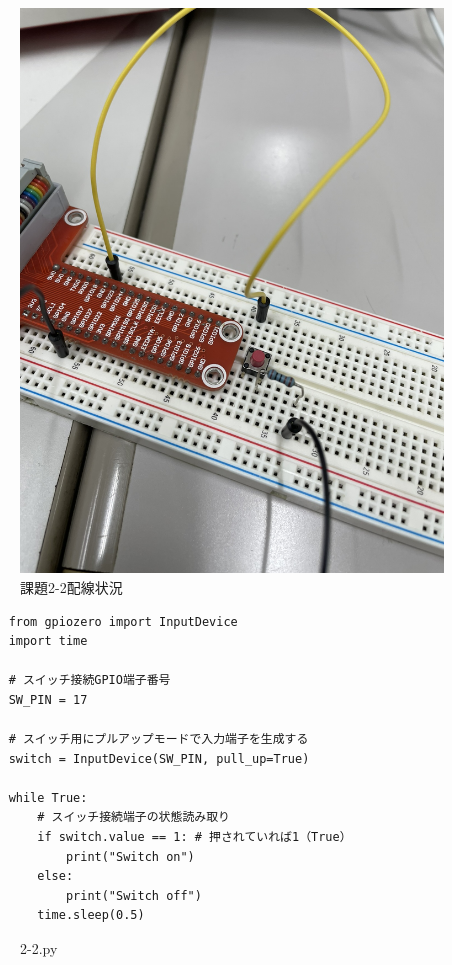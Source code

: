\documentclass{ltjsarticle} %
\begin{document}
\begin{figure}[H]
\begin{minipage}{0.45\textwidth}
    \includegraphics[width=\textwidth]{raspi2-2.JPEG} %
    \caption{課題2-2配線状況} %
    \label{fig:raspi2-2} %
  \end{minipage}
\end{figure}

\begin{mdframed}
  \begin{verbatim}
    from gpiozero import InputDevice
    import time

    # スイッチ接続GPIO端⼦番号
    SW_PIN = 17

    # スイッチ⽤にプルアップモードで⼊⼒端⼦を⽣成する
    switch = InputDevice(SW_PIN, pull_up=True)

    while True:
        # スイッチ接続端⼦の状態読み取り
        if switch.value == 1: # 押されていれば1（True）
            print("Switch on")
        else:
            print("Switch off")
        time.sleep(0.5)	
  \end{verbatim}
  \end{mdframed}
  \begin{figure}[H]
  \caption{2-2.py}
  \label{fig:2-2py}
  \end{figure}
\end{document}
